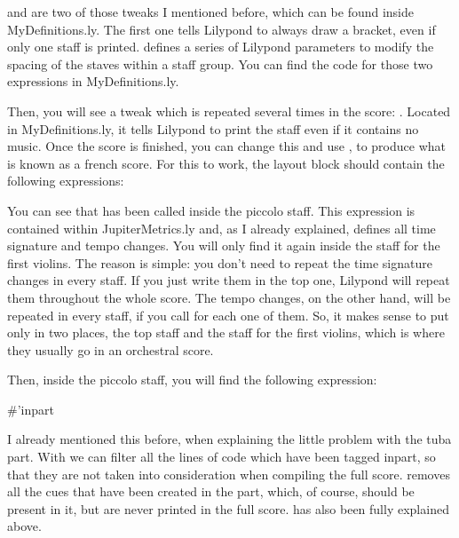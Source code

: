 \documentclass[../../LilyPond-Tutorials]{subfiles}
\begin{document}
 and  are two of those tweaks I mentioned before, which can be found inside MyDefinitions.ly.
The first one tells Lilypond to always draw a bracket, even if only one staff is printed.
 defines a series of Lilypond parameters to modify the spacing of the staves within a staff group.
You can find the code for those two expressions in MyDefinitions.ly.

Then, you will see a tweak which is repeated several times in the score: .
Located in MyDefinitions.ly, it tells Lilypond to print the staff even if it contains no music.
Once the score is finished, you can change this and use , to produce what is known as a french score.
For this to work, the layout block should contain the following expressions:

\begin{lilypondcode}
\context { \Staff \RemoveEmptyStaves }
\context { \DrumStaff \RemoveEmptyStaves }
\end{lilypondcode}

You can see that  has been called inside the piccolo staff.
This expression is contained within JupiterMetrics.ly and, as I already explained, defines all time signature and tempo changes.
You will only find it again inside the staff for the first violins.
The reason is simple: you don't need to repeat the time signature changes in every staff. If you just write them in the top one, Lilypond will repeat them throughout the whole score.
The tempo changes, on the other hand, will be repeated in every staff, if you call  for each one of them.
So, it makes sense to put  only in two places, the top staff and the staff for the first violins, which is where they usually go in an orchestral score.

Then, inside the piccolo staff, you will find the following expression:

\begin{lilypondcode}
\removeWithTag #'inpart { 
       \killCues { 
              \partcombine 
                     \PiccoloOne 
                     \PiccoloTwo 
       } 
}
\end{lilypondcode}

I already mentioned this before, when explaining the little problem with the tuba part.
With  we can filter all the lines of code which have been tagged inpart, so that they are not taken into consideration when compiling the full score.
 removes all the cues that have been created in the part, which, of course, should be present in it, but are never printed in the full score.
 has also been fully explained above.
\end{document}
